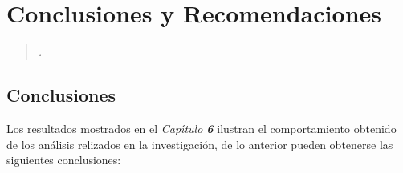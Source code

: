 
\chapter{ Conclusiones y Recomendaciones}

\begin{flushleft}
\begin{verse}
	\emph{.}
  \newline 
\end{verse}
\end{flushleft}

\section{Conclusiones}

Los resultados mostrados en el \emph{Cap\'{\i}tulo \textbf{6}} ilustran el comportamiento obtenido de los an\'alisis relizados en la investigaci\'on, de lo anterior pueden obtenerse las siguientes conclusiones:

